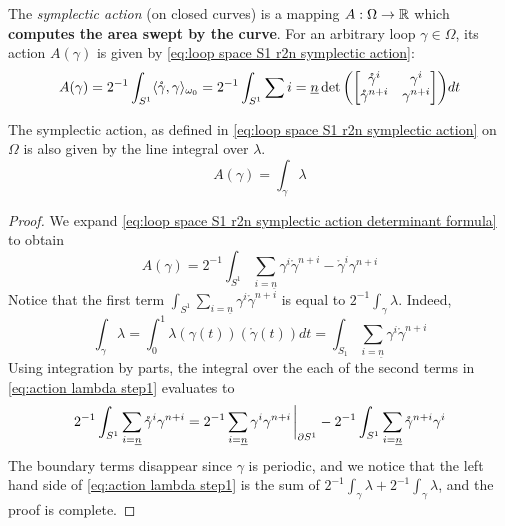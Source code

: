 \documentclass[../main-v2-manifolds.tex]{subfiles}
\begin{document}
\begin{definition}\label{def:symplectic action closed curves}
    The \emph{symplectic action} (on closed curves) is a mapping $A:\Omega\to\mathbb{R}$ which \textbf{computes the area swept by the curve}. For an arbitrary loop $\gamma\in\Omega$, its action $A(\gamma)$ is given by \cref{eq:loop space S1 r2n symplectic action}:
    \begin{equation}
        A(\gamma) = 2^{-1}\int_{S^1}\langle\mathring{\gamma},\gamma\rangle_{\omega_0} = 2^{-1}\int_{S^1}\sum{i=\underline{n}}\det\qty(\mqty[\mathring{\gamma}^{i} & \gamma^{i}\\ \mathring{\gamma}^{n+i} & \gamma^{n+i}])dt
        \label{eq:loop space S1 r2n symplectic action}
    \end{equation}
    
\end{definition}
\begin{lemma}
    The symplectic action, as defined in \cref{eq:loop space S1 r2n symplectic action} on $\Omega$ is also given by the line integral over $\lambda$.
    \begin{equation}
        A(\gamma) = \int_{\gamma}\lambda
        \label{eq:loop space S1 r2n symplectic action lambda}
    \end{equation}
\end{lemma}
\begin{proof}
    We expand \cref{eq:loop space S1 r2n symplectic action determinant formula} to obtain 
    \begin{equation}
        A(\gamma) = 2^{-1}\int_{S^1} \sum_{i =\underline{n}} \gamma^i\mathring{\gamma}^{n+i} - \mathring{\gamma}^{i}\gamma^{n+i} 
        \label{eq:action lambda step1}
    \end{equation}
    Notice that the first term $\int_{S^1} \sum_{i=\underline{n}} \gamma^i\mathring{\gamma}^{n+i}$ is equal to $2^{-1}\int_\gamma \lambda$. Indeed,
    \[
        \int_{\gamma}\lambda = \int_{0}^1 \lambda(\gamma(t))(\mathring{\gamma}(t)) dt = \int_{S_1} \sum_{i=\underline{n}}\gamma^i\mathring{\gamma}^{n+i}
    \]
    Using integration by parts, the integral over the each of the second terms in \cref{eq:action lambda step1} evaluates to
    \[
        2^{-1}\int_{S^1} \sum_{i=\underline{n}} \mathring{\gamma}^{i}\gamma^{n+i}=2^{-1}\sum_{i=\underline{n}}\gamma^{i}\gamma^{n+i}\eval_{\partial S^1} - 2^{-1}\int_{S^1}\sum_{i=\underline{n}}\mathring{\gamma}^{n+i}\gamma^{i}
    \]
    The boundary terms disappear since $\gamma$ is periodic, and we notice that the left hand side of \cref{eq:action lambda step1} is the sum of $2^{-1}\int_\gamma\lambda + 2^{-1}\int_{\gamma}\lambda$, and the proof is complete.
\end{proof}
\end{document}
